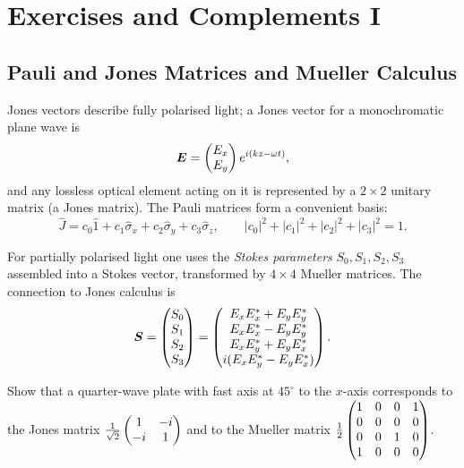 \chapter{Exercises and Complements I}

\section{Pauli and Jones Matrices and Mueller Calculus}

Jones vectors describe fully polarised light; a Jones vector for a monochromatic
plane wave is
\begin{equation}
\bm{E} = \begin{pmatrix} E_x \\ E_y \end{pmatrix} e^{i(kz-\omega t)},
\label{eq:5.1.1}
\end{equation}
and any lossless optical element acting on it is represented by a $2\times2$
unitary matrix (a Jones matrix). The Pauli matrices form a convenient basis:
\begin{equation}
\hat J = c_0\hat 1 + c_1\hat\sigma_x + c_2\hat\sigma_y + c_3\hat\sigma_z,
\qquad |c_0|^2+|c_1|^2+|c_2|^2+|c_3|^2 = 1.
\label{eq:5.1.2}
\end{equation}

For partially polarised light one uses the \emph{Stokes parameters}
$S_0,S_1,S_2,S_3$ assembled into a Stokes vector, transformed by $4\times4$
Mueller matrices. The connection to Jones calculus is
\begin{equation}
\bm{S} = \begin{pmatrix} S_0\\S_1\\S_2\\S_3 \end{pmatrix}
= \begin{pmatrix}
E_xE_x^*+E_yE_y^*\\
E_xE_x^*-E_yE_y^*\\
E_xE_y^*+E_yE_x^*\\
i(E_xE_y^*-E_yE_x^*)
\end{pmatrix}.
\label{eq:5.1.3}
\end{equation}

\begin{exercise}
Show that a quarter-wave plate with fast axis at $45^\circ$ to the $x$-axis
corresponds to the Jones matrix
$\frac{1}{\sqrt2}\begin{pmatrix}1&-i\\-i&1\end{pmatrix}$
and to the Mueller matrix
$\frac12\begin{pmatrix}1&0&0&1\\0&0&0&0\\0&0&1&0\\1&0&0&0\end{pmatrix}$.
\end{exercise}


